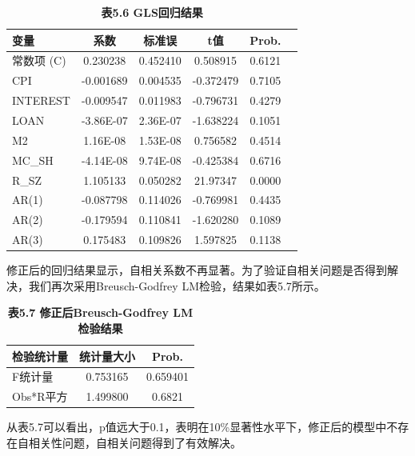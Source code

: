 \documentclass[12pt, a4paper]{article}
\numberwithin{equation}{section}
\begin{document}
\begin{table}[h!]
    \centering
    \captionsetup{labelformat=empty}
    \caption{\textbf{\fontsize{9pt}{11pt}\selectfont 表5.6 GLS回归结果}}
    \begin{tabular}{lccccc}
        \toprule
        变量       & 系数        & 标准误      & t值        & Prob.  \\
        \midrule
        常数项 (C)  & 0.230238  & 0.452410 & 0.508915  & 0.6121 \\
        CPI      & -0.001689 & 0.004535 & -0.372479 & 0.7105 \\
        INTEREST & -0.009547 & 0.011983 & -0.796731 & 0.4279 \\
        LOAN     & -3.86E-07 & 2.36E-07 & -1.638224 & 0.1051 \\
        M2       & 1.16E-08  & 1.53E-08 & 0.756582  & 0.4514 \\
        MC\_SH   & -4.14E-08 & 9.74E-08 & -0.425384 & 0.6716 \\
        R\_SZ    & 1.105133  & 0.050282 & 21.97347  & 0.0000 \\
        AR(1)    & -0.087798 & 0.114026 & -0.769981 & 0.4435 \\
        AR(2)    & -0.179594 & 0.110841 & -1.620280 & 0.1089 \\
        AR(3)    & 0.175483  & 0.109826 & 1.597825  & 0.1138 \\
        \bottomrule
    \end{tabular}
\end{table}

修正后的回归结果显示，自相关系数不再显著。为了验证自相关问题是否得到解决，我们再次采用Breusch-Godfrey LM检验，结果如表5.7所示。

\begin{table}[h!]
    \centering
    \captionsetup{labelformat=empty}
    \caption{\textbf{\fontsize{9pt}{11pt}\selectfont 表5.7 修正后Breusch-Godfrey LM检验结果}}
    \begin{tabular}{lcc}
        \toprule
        检验统计量   & 统计量大小    & Prob.    \\
        \midrule
        F统计量    & 0.753165 & 0.659401 \\
        Obs*R平方 & 1.499800 & 0.6821   \\
        \bottomrule
    \end{tabular}
\end{table}

从表5.7可以看出，p值远大于0.1，表明在10\%显著性水平下，修正后的模型中不存在自相关性问题，自相关问题得到了有效解决。
\end{document}
